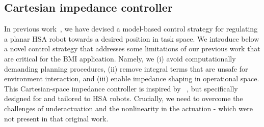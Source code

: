 \documentclass[letterpaper, 10pt, conference]{ieeeconf}      %
\begin{document}
\subsection{Cartesian impedance controller}\label{sub:braincontrol:computational_controller}
In previous work~\cite{stolzle2023experimental}, we have devised a model-based control strategy for regulating a planar \gls{HSA} robot towards a desired position in task space. %
%
We introduce below a novel control strategy that addresses some limitations of our previous work that are critical for the \gls{BMI} application. Namely, we (i) avoid computationally demanding planning procedures, (ii) remove integral terms that are unsafe for environment interaction, and (iii) enable impedance shaping in operational space. This Cartesian-space impedance controller is inspired by ~\cite{ott2008cartesian,della2020model}, but specifically designed for and tailored to \gls{HSA} robots. Crucially, we need to overcome the challenges of underactuation and the nonlinearity in the actuation - which were not present in that original work. %
\end{document}
